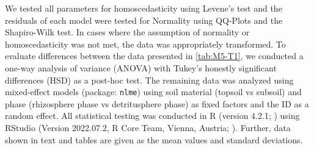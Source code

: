 We tested all parameters for homoscedasticity using Levene's test and the residuals of each model were tested for Normality using QQ-Plots and the Shapiro-Wilk test. In cases where the assumption of normality or homoscedasticity was not met, the data was appropriately transformed. To evaluate differences between the data presented in \ref{tab:M5-T1}, we conducted a one-way analysis of variance (ANOVA) with Tukey's honestly significant differences (HSD) as a post-hoc test. The remaining data was analyzed using mixed-effect models (package: \texttt{nlme}) using soil material (topsoil vs subsoil) and phase (rhizosphere phase vs detritusphere phase) as fixed factors and the ID as a random effect. All statistical testing was conducted in R (version 4.2.1; \citep{RCoreTeam2008}) using RStudio (Version 2022.07.2, R Core Team, Vienna, Austria; \citep{RStudioTeam2015}). Further, data shown in text and tables are given as the mean values and standard deviations.


